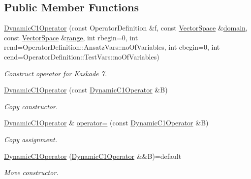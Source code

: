 \subsection*{Public Member Functions}
\begin{DoxyCompactItemize}
\item 
\hyperlink{classSpacy_1_1Kaskade_1_1DynamicC1Operator_a5b9e778e72f9e8039efcfca2a5776528_a5b9e778e72f9e8039efcfca2a5776528}{Dynamic\+C1\+Operator} (const Operator\+Definition \&f, const \hyperlink{classSpacy_1_1VectorSpace}{Vector\+Space} \&\hyperlink{classSpacy_1_1OperatorBase_a2588f9b3e0188820c4c494e63293dc6f_a2588f9b3e0188820c4c494e63293dc6f}{domain}, const \hyperlink{classSpacy_1_1VectorSpace}{Vector\+Space} \&\hyperlink{classSpacy_1_1OperatorBase_ab19d3b7a6f290b1079248f1e567e53d6_ab19d3b7a6f290b1079248f1e567e53d6}{range}, int rbegin=0, int rend=Operator\+Definition\+::\+Ansatz\+Vars\+::no\+Of\+Variables, int cbegin=0, int cend=Operator\+Definition\+::\+Test\+Vars\+::no\+Of\+Variables)
\begin{DoxyCompactList}\small\item\em Construct operator for Kaskade 7. \end{DoxyCompactList}\item 
\hyperlink{classSpacy_1_1Kaskade_1_1DynamicC1Operator_ac0d968516e017aa8e46f33273ee715b4_ac0d968516e017aa8e46f33273ee715b4}{Dynamic\+C1\+Operator} (const \hyperlink{classSpacy_1_1Kaskade_1_1DynamicC1Operator}{Dynamic\+C1\+Operator} \&B)
\begin{DoxyCompactList}\small\item\em Copy constructor. \end{DoxyCompactList}\item 
\hyperlink{classSpacy_1_1Kaskade_1_1DynamicC1Operator}{Dynamic\+C1\+Operator} \& \hyperlink{classSpacy_1_1Kaskade_1_1DynamicC1Operator_aa096a4b6941e19a9855eb1b2fa8ab156_aa096a4b6941e19a9855eb1b2fa8ab156}{operator=} (const \hyperlink{classSpacy_1_1Kaskade_1_1DynamicC1Operator}{Dynamic\+C1\+Operator} \&B)
\begin{DoxyCompactList}\small\item\em Copy assignment. \end{DoxyCompactList}\item 
\hyperlink{classSpacy_1_1Kaskade_1_1DynamicC1Operator_a7e946ceb59cd4c4ab283a0ac55312eee_a7e946ceb59cd4c4ab283a0ac55312eee}{Dynamic\+C1\+Operator} (\hyperlink{classSpacy_1_1Kaskade_1_1DynamicC1Operator}{Dynamic\+C1\+Operator} \&\&B)=default
\begin{DoxyCompactList}\small\item\em Move constructor. \end{DoxyCompactList}\item 

\end{DoxyCompactItemize}
